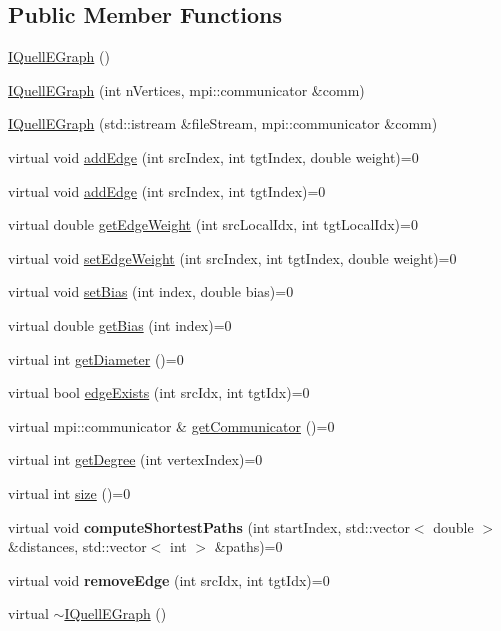 \subsection*{Public Member Functions}
\begin{DoxyCompactItemize}
\item 
\hyperlink{a00076_ac065b4d432b0c6ec3a13e42cc68aa20b}{I\+Quell\+E\+Graph} ()
\item 
\hyperlink{a00076_a6b48a0ef9f45576a76b17120989d2010}{I\+Quell\+E\+Graph} (int n\+Vertices, mpi\+::communicator \&comm)
\item 
\hyperlink{a00076_a685a746863199945d2f1a54294631b94}{I\+Quell\+E\+Graph} (std\+::istream \&file\+Stream, mpi\+::communicator \&comm)
\item 
virtual void \hyperlink{a00076_af4cfe0f4a87f8beff287c46d05622fcf}{add\+Edge} (int src\+Index, int tgt\+Index, double weight)=0
\item 
virtual void \hyperlink{a00076_a80a286007b70ccb9cfcd625893c1e9e4}{add\+Edge} (int src\+Index, int tgt\+Index)=0
\item 
virtual double \hyperlink{a00076_aedb391f2d8779e997d96189a896c202e}{get\+Edge\+Weight} (int src\+Local\+Idx, int tgt\+Local\+Idx)=0
\item 
virtual void \hyperlink{a00076_a1fbc422e979b9e34a71af3a5846776fb}{set\+Edge\+Weight} (int src\+Index, int tgt\+Index, double weight)=0
\item 
virtual void \hyperlink{a00076_ac6185f23e474c74424f1f2d4c8bfac9f}{set\+Bias} (int index, double bias)=0
\item 
virtual double \hyperlink{a00076_a5dc512ede77ec02b09f49d3dae251490}{get\+Bias} (int index)=0
\item 
virtual int \hyperlink{a00076_a3190e49d715ddfd85691d1217d52c733}{get\+Diameter} ()=0
\item 
virtual bool \hyperlink{a00076_a12c0ce7cb02250a54e62ebf52eb40f50}{edge\+Exists} (int src\+Idx, int tgt\+Idx)=0
\item 
virtual mpi\+::communicator \& \hyperlink{a00076_a14115edf10d1aa5f647e564a895738af}{get\+Communicator} ()=0
\item 
virtual int \hyperlink{a00076_a5662f92a689dd68297d466d20fdc380a}{get\+Degree} (int vertex\+Index)=0
\item 
virtual int \hyperlink{a00076_a6ff128af05ee8ed24ce85d71af3cd0a0}{size} ()=0
\item 
virtual void {\bfseries compute\+Shortest\+Paths} (int start\+Index, std\+::vector$<$ double $>$ \&distances, std\+::vector$<$ int $>$ \&paths)=0\hypertarget{a00076_a7efdd6c12b6c4068c472a59e8a507dd6}{}\label{a00076_a7efdd6c12b6c4068c472a59e8a507dd6}

\item 
virtual void {\bfseries remove\+Edge} (int src\+Idx, int tgt\+Idx)=0\hypertarget{a00076_a516dd1e34370a04a24824e374d4d2286}{}\label{a00076_a516dd1e34370a04a24824e374d4d2286}

\item 
virtual \hyperlink{a00076_a362ba11a16d9c3cd749ef090d11ed22e}{$\sim$\+I\+Quell\+E\+Graph} ()
\end{DoxyCompactItemize}


